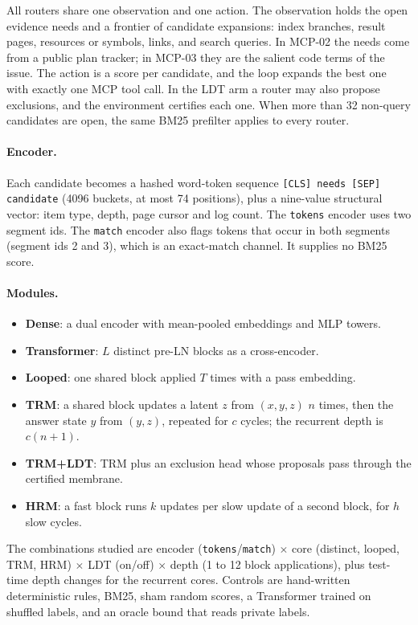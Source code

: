 All routers share one observation and one action. The observation holds the open evidence needs and a frontier of
candidate expansions: index branches, result pages, resources or symbols, links, and search queries. In MCP-02 the
needs come from a public plan tracker; in MCP-03 they are the salient code terms of the issue. The action is a score
per candidate, and the loop expands the best one with exactly one MCP tool call. In the LDT arm a router may also
propose exclusions, and the environment certifies each one. When more than 32 non-query candidates are open, the same
BM25 prefilter applies to every router.

\paragraph{Encoder.} Each candidate becomes a hashed word-token sequence \texttt{[CLS] needs [SEP] candidate} (4096
buckets, at most 74 positions), plus a nine-value structural vector: item type, depth, page cursor and log count. The
\texttt{tokens} encoder uses two segment ids. The \texttt{match} encoder also flags tokens that occur in both segments
(segment ids 2 and 3), which is an exact-match channel. It supplies no BM25 score.

\paragraph{Modules.}
\begin{itemize}
\item \textbf{Dense}: a dual encoder with mean-pooled embeddings and MLP towers.
\item \textbf{Transformer}: $L$ distinct pre-LN blocks as a cross-encoder.
\item \textbf{Looped}: one shared block applied $T$ times with a pass embedding.
\item \textbf{TRM}: a shared block updates a latent $z$ from $(x, y, z)$ $n$ times, then the answer state $y$ from
$(y, z)$, repeated for $c$ cycles; the recurrent depth is $c(n+1)$.
\item \textbf{TRM+LDT}: TRM plus an exclusion head whose proposals pass through the certified membrane.
\item \textbf{HRM}: a fast block runs $k$ updates per slow update of a second block, for $h$ slow cycles.
\end{itemize}
The combinations studied are encoder (\texttt{tokens}/\texttt{match}) $\times$ core (distinct, looped, TRM, HRM)
$\times$ LDT (on/off) $\times$ depth (1 to 12 block applications), plus test-time depth changes for the recurrent
cores. Controls are hand-written deterministic rules, BM25, sham random scores, a Transformer trained on shuffled
labels, and an oracle bound that reads private labels.

